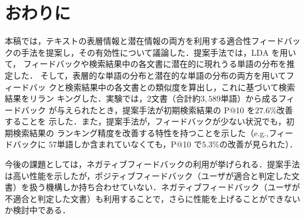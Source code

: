 \documentclass[japanese]{jnlp_1.4}
\begin{document}
\section{おわりに} \label{sec:conclusion}

本稿では，テキストの表層情報と潜在情報の両方を利用する適合性フィードバッ
クの手法を提案し，その有効性について議論した．提案手法では，LDA を用いて，
フィードバックや検索結果中の各文書に潜在的に現れうる単語の分布を推定した．
そして，表層的な単語の分布と潜在的な単語の分布の両方を用いてフィードバッ
クと検索結果中の各文書との類似度を算出し，これに基づいて検索結果をリラン
キングした．実験では，$2$文書（合計約$3,589$単語）から成るフィードバック
が与えられたとき，提案手法が初期検索結果の P@10 を$27.6\%$改善することを
示した．また，提案手法が，フィードバックが少ない状況でも，初期検索結果の
ランキング精度を改善する特性を持つことを示した（e.g.,フィードバックに
$57$単語しか含まれていなくても，P@10 で$5.3\%$の改善が見られた）．

今後の課題としては，ネガティブフィードバックの利用が挙げられる．提案手法
は高い性能を示したが，ポジティブフィードバック（ユーザが適合と判定した文
書）を扱う機構しか持ち合わせていない．ネガティブフィードバック（ユーザが
不適合と判定した文書）も利用することで，さらに性能を上げることができない
か検討中である．
\end{document}
